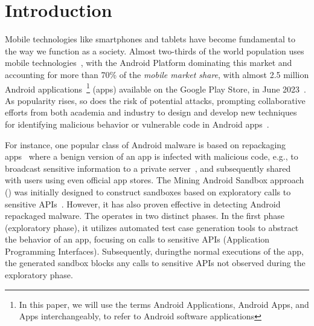 \section{Introduction}\label{sec:introduction}

Mobile technologies like smartphones and tablets have become fundamental to the way we function as a society. Almost two-thirds of the world population
uses mobile technologies~\cite{Comscore,DBLP:journals/tse/MartinSJZH17}, with the
Android Platform dominating this market and accounting for more than 70\% of the \emph{mobile
market share}, with almost 2.5 million Android applications~\footnote{In this paper, we will use the terms Android Applications, Android Apps, and Apps interchangeably, to refer to Android software applications} (apps)
available on the Google Play Store, in June 2023~\cite{Statista}.  
As popularity rises, so does the risk of potential attacks, prompting collaborative efforts from both academia and industry to design and develop new techniques for identifying malicious behavior or vulnerable code in Android apps~\cite{10.1145/3017427}.

For instance, one popular class of Android malware is based on repackaging apps~\cite{DBLP:conf/wcre/BaoLL18,le2018towards} where a benign
version of an app is
infected with malicious code, e.g., to broadcast
sensitive information to a private server~\cite{DBLP:journals/tse/LiBK21}, and subsequently shared
with users using even official app stores. The Mining Android Sandbox approach (\mas) was initially designed to construct sandboxes based on exploratory calls to sensitive APIs~\cite{DBLP:conf/icse/JamrozikSZ16}. However, it has also proven effective in detecting Android repackaged malware. The \mas operates in two distinct phases. In the first phase (exploratory phase), it utilizes automated test case generation tools to abstract the behavior of an app, focusing on calls to sensitive APIs (Application Programming Interfaces). Subsequently, duringthe normal executions of the app, the generated sandbox blocks any calls to sensitive APIs not observed during the exploratory phase.

